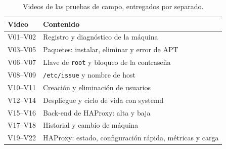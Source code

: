 \begin{table}[!t]
  \centering
  \caption{Videos de las pruebas de campo, entregados por separado.}
  \label{tab:evidencias}
  \footnotesize
  \begin{tabularx}{\columnwidth}{@{}l X@{}}
    \hline
    Video & Contenido \\
    \hline
    V01--V02 & Registro y diagnóstico de la máquina \\
    V03--V05 & Paquetes: instalar, eliminar y error de APT \\
    V06--V07 & Llave de \texttt{root} y bloqueo de la contraseña \\
    V08--V09 & \texttt{/etc/issue} y nombre de host \\
    V10--V11 & Creación y eliminación de usuarios \\
    V12--V14 & Despliegue y ciclo de vida con systemd \\
    V15--V16 & Back-end de HAProxy: alta y baja \\
    V17--V18 & Historial y cambio de máquina \\
    V19--V22 & HAProxy: estado, configuración rápida, métricas y carga \\
    \hline
  \end{tabularx}
\end{table}

\FloatBarrier
